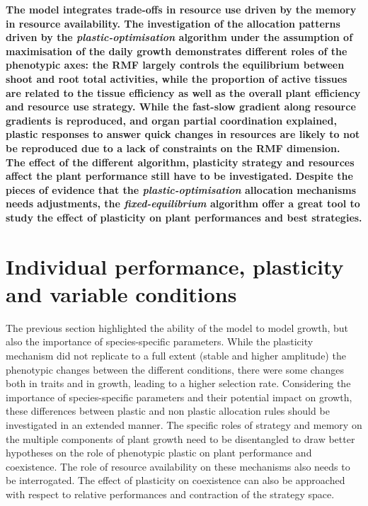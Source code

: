 \textbf{The model \model integrates trade-offs in resource use driven by the memory in resource availability. The investigation of the allocation patterns driven by the \textit{plastic-optimisation}   algorithm under the assumption of maximisation of the daily growth demonstrates different roles of the phenotypic axes: the RMF largely controls the equilibrium between shoot and root total activities, while the proportion of active tissues are related to the tissue efficiency as well as the overall plant efficiency and resource use strategy. While the fast-slow gradient along resource gradients is reproduced, and organ partial coordination explained, plastic responses to answer quick changes in resources are likely to not be reproduced due to a lack of constraints on the RMF dimension. The effect of the different algorithm, plasticity strategy and resources affect the plant performance still have to be investigated. Despite the pieces of evidence that the \textit{plastic-optimisation} allocation mechanisms needs adjustments, the \textit{fixed-equilibrium} algorithm offer a great tool to study the effect of plasticity on plant performances and best strategies.}


\chapter{Individual performance, plasticity and variable conditions}\label{chapter:individual}

The previous section highlighted the ability of the model to model growth, but also the importance of species-specific parameters. While the plasticity mechanism did not replicate to a full extent (stable and higher amplitude) the phenotypic changes between the different conditions, there were some changes both in traits and in growth, leading to a higher selection rate. Considering the importance of species-specific parameters and their potential impact on growth, these differences between plastic and non plastic allocation rules should be investigated in an extended manner. The specific roles of strategy and memory on the multiple components of plant growth need to be disentangled to draw better hypotheses on the role of phenotypic plastic on plant performance and coexistence. The role of resource availability on these mechanisms also needs to be interrogated. The effect of plasticity on coexistence can also be approached with respect to relative performances and contraction of the strategy space.

